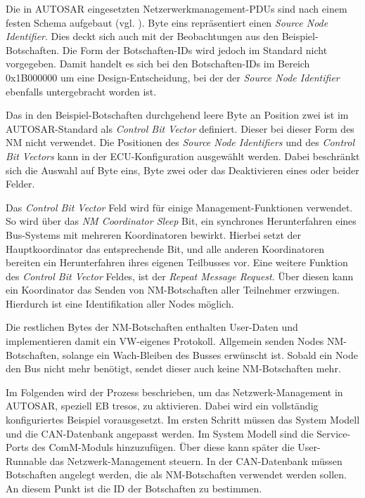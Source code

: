 \documentclass[
  a4paper,					    %
  twoside,
  DIV=calc,     				%
  bibliography=totoc,
  cleardoublepage=empty,
  ngerman,     					%
  final       					%
]{scrbook}
\begin{document}
Die in AUTOSAR eingesetzten Netzerwerkmanagement-PDUs sind nach einem festen Schema aufgebaut (vgl. \cite[Seite 51]{autosar_cannm}). Byte eins repräsentiert einen \emph{Source Node Identifier}. Dies deckt sich auch mit der Beobachtungen aus den Beispiel-Botschaften. Die Form der Botschaften-IDs wird jedoch im Standard nicht vorgegeben. Damit handelt es sich bei den Botschaften-IDs im Bereich 0x1B000000 um eine Design-Entscheidung, bei der der \emph{Source Node Identifier} ebenfalls untergebracht worden ist.

Das in den Beispiel-Botschaften durchgehend leere Byte an Position zwei ist im AUTOSAR-Standard als \emph{Control Bit Vector} definiert. Dieser bei dieser Form des NM nicht verwendet. Die Positionen des \emph{Source Node Identifiers} und des \emph{Control Bit Vectors} kann in der ECU-Konfiguration ausgewählt werden. Dabei beschränkt sich die Auswahl auf Byte eins, Byte zwei oder das Deaktivieren eines oder beider Felder.

Das \emph{Control Bit Vector} Feld wird für einige Management-Funktionen verwendet. So wird über das \emph{NM Coordinator Sleep} Bit, ein synchrones Herunterfahren eines Bus-Systems mit mehreren Koordinatoren bewirkt. Hierbei setzt der Hauptkoordinator das entsprechende Bit, und alle anderen Koordinatoren bereiten ein Herunterfahren ihres eigenen Teilbusses vor. Eine weitere Funktion des \emph{Control Bit Vector} Feldes, ist der \emph{Repeat Message Request}. Über diesen kann ein Koordinator das Senden von NM-Botschaften aller Teilnehmer erzwingen. Hierdurch ist eine Identifikation aller Nodes möglich.

Die restlichen Bytes der NM-Botschaften enthalten User-Daten und implementieren damit ein VW-eigenes Protokoll. Allgemein senden Nodes NM-Botschaften, solange ein Wach-Bleiben des Busses erwünscht ist. Sobald ein Node den Bus nicht mehr benötigt, sendet dieser auch keine NM-Botschaften mehr.

Im Folgenden wird der Prozess beschrieben, um das Netzwerk-Management in AUTOSAR, speziell EB tresos, zu aktivieren. Dabei wird ein vollständig konfiguriertes Beispiel vorausgesetzt. Im ersten Schritt müssen das System Modell und die CAN-Datenbank angepasst werden. Im System Modell sind die Service-Ports des ComM-Moduls hinzuzufügen. Über diese kann später die User-Runnable das Netzwerk-Management steuern. In der CAN-Datenbank müssen Botschaften angelegt werden, die als NM-Botschaften verwendet werden sollen. An diesem Punkt ist die ID der Botschaften zu bestimmen.
\end{document}
